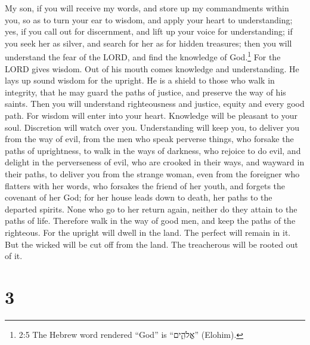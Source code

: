  My son, if you will receive my words, and store up my
commandments within you,  so as to turn your ear to wisdom,
and apply your heart to understanding;  yes, if you call out
for discernment, and lift up your voice for understanding; 
if you seek her as silver, and search for her as for hidden treasures;
 then you will understand the fear of the LORD, and find the
knowledge of God.\footnote{2:5 The Hebrew word rendered ``God'' is
  ``אֱלֹהִ֑ים'' (Elohim).}  For the LORD gives wisdom. Out
of his mouth comes knowledge and understanding.  He lays up
sound wisdom for the upright. He is a shield to those who walk in
integrity,  that he may guard the paths of justice, and
preserve the way of his saints.  Then you will understand
righteousness and justice, equity and every good path.  For
wisdom will enter into your heart. Knowledge will be pleasant to your
soul.  Discretion will watch over you. Understanding will
keep you,  to deliver you from the way of evil, from the
men who speak perverse things,  who forsake the paths of
uprightness, to walk in the ways of darkness,  who rejoice
to do evil, and delight in the perverseness of evil,  who
are crooked in their ways, and wayward in their paths,  to
deliver you from the strange woman, even from the foreigner who flatters
with her words,  who forsakes the friend of her youth, and
forgets the covenant of her God;  for her house leads down
to death, her paths to the departed spirits.  None who go
to her return again, neither do they attain to the paths of life.
 Therefore walk in the way of good men, and keep the paths
of the righteous.  For the upright will dwell in the land.
The perfect will remain in it.  But the wicked will be cut
off from the land. The treacherous will be rooted out of it.

\hypertarget{section-2}{%
\section{3}\label{section-2}}

